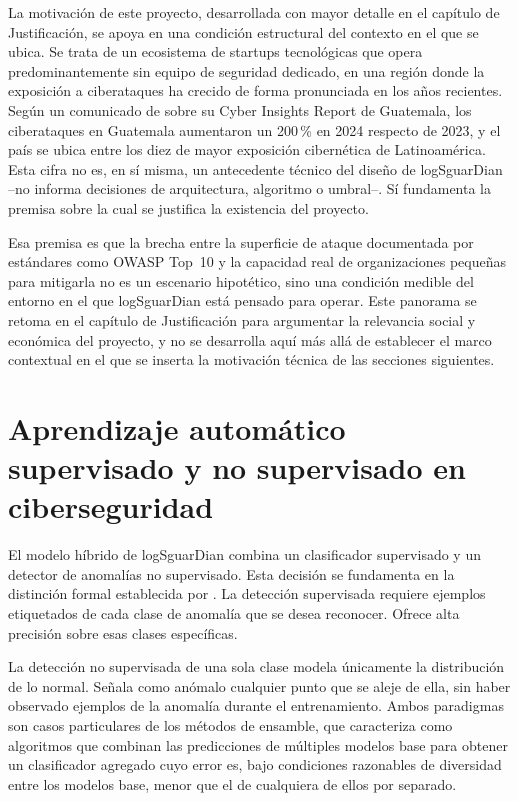La motivación de este proyecto, desarrollada con mayor detalle en el capítulo de Justificación, se apoya en una condición estructural del contexto en el que se ubica. Se trata de un ecosistema de startups tecnológicas que opera predominantemente sin equipo de seguridad dedicado, en una región donde la exposición a ciberataques ha crecido de forma pronunciada en los años recientes. Según un comunicado de \textcite{mastercard2025} sobre su Cyber Insights Report de Guatemala, los ciberataques en Guatemala aumentaron un 200\,\% en 2024 respecto de 2023, y el país se ubica entre los diez de mayor exposición cibernética de Latinoamérica. Esta cifra no es, en sí misma, un antecedente técnico del diseño de logSguarDian --no informa decisiones de arquitectura, algoritmo o umbral--. Sí fundamenta la premisa sobre la cual se justifica la existencia del proyecto.

Esa premisa es que la brecha entre la superficie de ataque documentada por estándares como OWASP Top~10 \parencite{owasp2021} y la capacidad real de organizaciones pequeñas para mitigarla no es un escenario hipotético, sino una condición medible del entorno en el que logSguarDian está pensado para operar. Este panorama se retoma en el capítulo de Justificación para argumentar la relevancia social y económica del proyecto, y no se desarrolla aquí más allá de establecer el marco contextual en el que se inserta la motivación técnica de las secciones siguientes.

\section{Aprendizaje automático supervisado y no supervisado en ciberseguridad}

El modelo híbrido de logSguarDian combina un clasificador supervisado y un detector de anomalías no supervisado. Esta decisión se fundamenta en la distinción formal establecida por \textcite{chandola2009}. La detección supervisada requiere ejemplos etiquetados de cada clase de anomalía que se desea reconocer. Ofrece alta precisión sobre esas clases específicas.

La detección no supervisada de una sola clase modela únicamente la distribución de lo normal. Señala como anómalo cualquier punto que se aleje de ella, sin haber observado ejemplos de la anomalía durante el entrenamiento. Ambos paradigmas son casos particulares de los métodos de ensamble, que \textcite{dietterich2000} caracteriza como algoritmos que combinan las predicciones de múltiples modelos base para obtener un clasificador agregado cuyo error es, bajo condiciones razonables de diversidad entre los modelos base, menor que el de cualquiera de ellos por separado.

